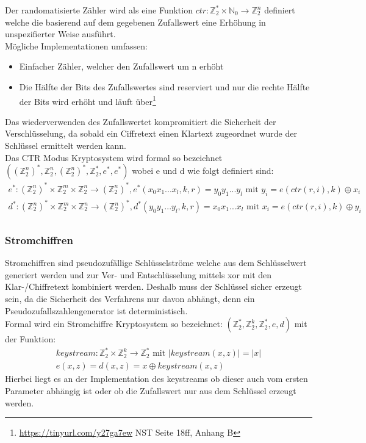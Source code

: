 \documentclass[a4paper,12pt,leqno]{article}
\begin{document}
Der randomatisierte Zähler wird als eine Funktion $ctr: \mathbb{Z}_2^*\times \mathbb{N}_0\rightarrow \mathbb{Z}_2^n$  definiert welche die basierend auf dem gegebenen Zufallswert eine Erhöhung in unspezifierter Weise ausführt.\\
Mögliche Implementationen umfassen:
\begin{itemize}
\item Einfacher Zähler, welcher den Zufallswert um n erhöht
\item  Die Hälfte der Bits des Zufallswertes sind reserviert und nur die rechte Hälfte der Bits wird erhöht und läuft über\footnote{\url{https://tinyurl.com/y27ga7ew} NST Seite 18ff, Anhang B}
\end{itemize}
Das wiederverwenden des Zufallswertet kompromitiert die Sicherheit der Verschlüsselung, da sobald ein Ciffretext einen Klartext zugeordnet wurde der Schlüssel ermittelt werden kann.\\
Das CTR Modus Kryptosystem wird formal so bezeichnet $((\mathbb{Z}_2^n)^*,\mathbb{Z}_2^n,(\mathbb{Z}_2^n)^*,\mathbb{Z}_2^*,e^*,e^*)$ wobei e und d wie folgt definiert sind:
\begin{align*}
e^*:(\mathbb{Z}_2^n)^*\times \mathbb{Z}_2^m \times \mathbb{Z}_2^n\rightarrow (\mathbb{Z}_2^n)^*, e^*(x_0x_1...x_l,k,r)=y_0y_1...y_l \textrm{ mit } y_i = e(ctr(r,i),k)\oplus x_i\\
d^*:(\mathbb{Z}_2^n)^*\times \mathbb{Z}_2^m \times \mathbb{Z}_2^n\rightarrow (\mathbb{Z}_2^n)^*, d^*(y_0y_1...y_l,k,r)=x_0x_1...x_l \textrm{ mit } x_i = e(ctr(r,i),k)\oplus y_i\\
\end{align*}
\subsubsection{Stromchiffren}
Stromchiffren sind pseudozufällige Schlüsselströme welche aus dem Schlüsselwert generiert werden und zur Ver- und Entschlüsselung mittels xor mit den Klar-/Chiffretext kombiniert werden. Deshalb muss der Schlüssel sicher erzeugt sein, da die Sicherheit des Verfahrens nur davon abhängt, denn ein Pseudozufallszahlengenerator ist deterministisch.\\
Formal wird ein Stromchiffre Kryptosystem so bezeichnet: $(\mathbb{Z}_2^*,\mathbb{Z}_2^k,\mathbb{Z}_2^*,e,d)$ mit der Funktion:
\begin{align*}
keystream: \mathbb{Z}_2^*\times \mathbb{Z}_2^k\rightarrow\mathbb{Z}_2^* \textrm{ mit } |keystream(x,z)|=|x|\\
e(x,z)=d(x,z) = x\oplus keystream(x,z)
\end{align*}
Hierbei liegt es an der Implementation des keystreams ob dieser auch vom ersten Parameter abhängig ist oder ob die Zufallswert nur aus dem Schlüssel erzeugt werden.
\end{document}
